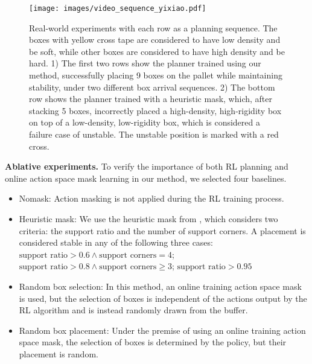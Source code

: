 

\begin{figure*}[h]  %
    \centering
    \texttt{[image: images/video\_sequence\_yixiao.pdf]}
    \vspace{-4pt}
    \caption{Real-world experiments with each row as a planning sequence. The boxes with yellow cross tape are considered to have low density and be soft, while other boxes are considered to have high density and be hard.
    1) The first two rows show the planner trained using our method, successfully placing 9 boxes on the pallet while maintaining stability, under two different box arrival sequences. 
    2) The bottom row shows the planner trained with a heuristic mask, which, after stacking 5 boxes, incorrectly placed a high-density, high-rigidity box on top of a low-density, low-rigidity box, which is considered a failure case of unstable. The unstable position is marked with a red cross.}
    \label{fig:frame_sequence}
    \vspace{-12pt}
\end{figure*}

\textbf{Ablative experiments. }
To verify the importance of both RL planning and online action space mask learning in our method, we selected four baselines.
\begin{itemize}
  \item Nomask: Action masking is not applied during the RL training process.
  \item Heuristic mask: We use the heuristic mask from \cite{zhao2021online}, which considers two criteria: the support ratio and the number of support corners. A placement is considered stable in any of the following three cases: $\text{support ratio}>0.6 \land \text{support corners} = 4$; $\text{support ratio}>0.8 \land \text{support corners}\geq 3$; $\text{support ratio}>0.95$
  \item Random box selection: In this method, an online training action space mask is used, but the selection of boxes is independent of the actions output by the RL algorithm and is instead randomly drawn from the buffer.
  \item Random box placement: Under the premise of using an online training action space mask, the selection of boxes is determined by the policy, but their placement is random.
\end{itemize}

